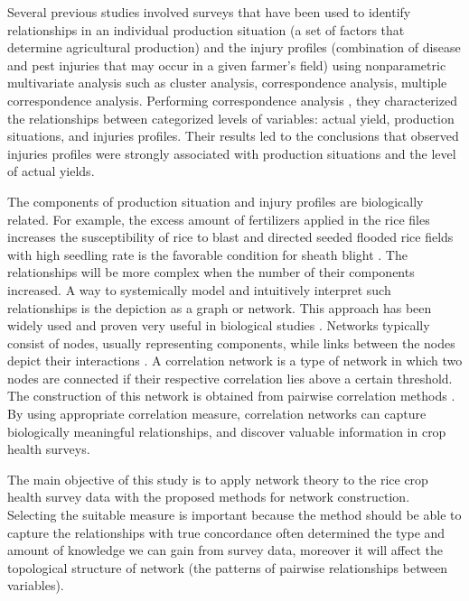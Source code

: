 \documentclass{frontiersSCNS} %
\begin{document}
Several previous studies \citep{Savary:2000char, savary2000quanti, savary2005multiple, dong2010characterization, Reddy:2011hl} involved surveys that have been used to identify relationships in an individual production situation (a set of factors that determine agricultural production) and the injury profiles (combination of disease and pest injuries that may occur in a given farmer's field) using nonparametric multivariate analysis such as cluster analysis, correspondence analysis, multiple correspondence analysis. Performing correspondence analysis \citep{savary1997new}, they characterized the relationships between categorized levels of variables: actual yield, production situations, and injuries profiles. Their results led to the conclusions that observed injuries profiles were strongly associated with production situations and the level of actual yields.

The components of production situation and injury profiles are biologically related. For example, the excess amount of fertilizers applied in the rice files increases the susceptibility of rice to blast and directed seeded flooded rice fields with high seedling rate is the favorable condition for sheath blight \citep{ouricedisease}. The relationships will be more complex when the number of their components increased. A way to systemically model and intuitively interpret such relationships is the depiction as a graph or network. This approach has been widely used and proven very useful in biological studies \citep{Lefebvre:2011fo}. Networks typically consist of nodes, usually representing components, while links between the nodes depict their interactions \citep{PROULX:2005hx}. A correlation network is a type of network in which two nodes are connected if their respective correlation lies above a certain threshold. The construction of this network is obtained from pairwise correlation methods \citep{Toubiana:2013cv}. By using appropriate correlation measure, correlation networks can capture biologically meaningful relationships, and discover valuable information in crop health surveys.

The main objective of this study is to apply network theory to the rice crop health survey data with the proposed methods for network construction. Selecting the suitable measure is important because the method should be able to capture the relationships with true concordance often determined the type and amount of knowledge we can gain from survey data, moreover it will affect the topological structure of network (the patterns of pairwise relationships between variables).
\end{document}
